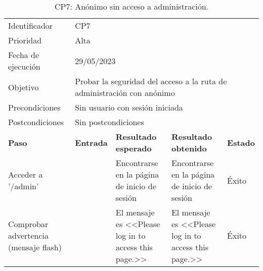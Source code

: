 \begin{table}[H]
\begin{tabular}{p{}p{}p{}p{}p{}}
\rowcolor{gray!25}
Identificador   & \multicolumn{4}{l}{CP7}                                                   \\
Prioridad   & \multicolumn{4}{l}{Alta}                                                    \\
\rowcolor{gray!25}
Fecha de ejecución   & \multicolumn{4}{l}{29/05/2023}                                                    \\
Objetivo        & \multicolumn{4}{p{0.80\textwidth}}{Probar la seguridad del acceso a la ruta de administración con anónimo}                                                     \\
\rowcolor{gray!25}
Precondiciones  & \multicolumn{4}{l}{Sin usuario con sesión iniciada}                                                     \\
Postcondiciones & \multicolumn{4}{l}{Sin postcondiciones}                                                     \\ \hline
\rowcolor{gray!25}
\textbf{Paso}   & \textbf{Entrada} & \textbf{Resultado esperado} & \textbf{Resultado obtenido} & \textbf{Estado} \\ \hline
Acceder a '/admin'                         &                        & Encontrarse en la página de inicio de sesión                                 & Encontrarse en la página de inicio de sesión                                     & Éxito  \\ \hline
Comprobar advertencia (mensaje flash)      &                        & El mensaje es <<Please log in to access this page.>>                               & El mensaje es <<Please log in to access this page.>>                                 & Éxito  \\ \hline 
\end{tabular}
\caption{CP7: Anónimo sin acceso a administración.}
\end{table}

